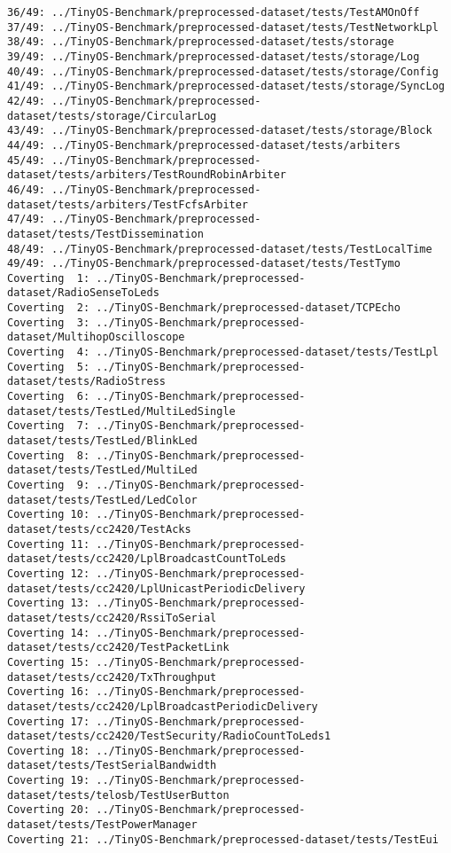 \documentclass[11pt]{article}
\begin{document}
\begin{Verbatim}[commandchars=\\\{\}]
36/49: ../TinyOS-Benchmark/preprocessed-dataset/tests/TestAMOnOff
37/49: ../TinyOS-Benchmark/preprocessed-dataset/tests/TestNetworkLpl
38/49: ../TinyOS-Benchmark/preprocessed-dataset/tests/storage
39/49: ../TinyOS-Benchmark/preprocessed-dataset/tests/storage/Log
40/49: ../TinyOS-Benchmark/preprocessed-dataset/tests/storage/Config
41/49: ../TinyOS-Benchmark/preprocessed-dataset/tests/storage/SyncLog
42/49: ../TinyOS-Benchmark/preprocessed-dataset/tests/storage/CircularLog
43/49: ../TinyOS-Benchmark/preprocessed-dataset/tests/storage/Block
44/49: ../TinyOS-Benchmark/preprocessed-dataset/tests/arbiters
45/49: ../TinyOS-Benchmark/preprocessed-dataset/tests/arbiters/TestRoundRobinArbiter
46/49: ../TinyOS-Benchmark/preprocessed-dataset/tests/arbiters/TestFcfsArbiter
47/49: ../TinyOS-Benchmark/preprocessed-dataset/tests/TestDissemination
48/49: ../TinyOS-Benchmark/preprocessed-dataset/tests/TestLocalTime
49/49: ../TinyOS-Benchmark/preprocessed-dataset/tests/TestTymo
Coverting  1: ../TinyOS-Benchmark/preprocessed-dataset/RadioSenseToLeds
Coverting  2: ../TinyOS-Benchmark/preprocessed-dataset/TCPEcho
Coverting  3: ../TinyOS-Benchmark/preprocessed-dataset/MultihopOscilloscope
Coverting  4: ../TinyOS-Benchmark/preprocessed-dataset/tests/TestLpl
Coverting  5: ../TinyOS-Benchmark/preprocessed-dataset/tests/RadioStress
Coverting  6: ../TinyOS-Benchmark/preprocessed-dataset/tests/TestLed/MultiLedSingle
Coverting  7: ../TinyOS-Benchmark/preprocessed-dataset/tests/TestLed/BlinkLed
Coverting  8: ../TinyOS-Benchmark/preprocessed-dataset/tests/TestLed/MultiLed
Coverting  9: ../TinyOS-Benchmark/preprocessed-dataset/tests/TestLed/LedColor
Coverting 10: ../TinyOS-Benchmark/preprocessed-dataset/tests/cc2420/TestAcks
Coverting 11: ../TinyOS-Benchmark/preprocessed-dataset/tests/cc2420/LplBroadcastCountToLeds
Coverting 12: ../TinyOS-Benchmark/preprocessed-dataset/tests/cc2420/LplUnicastPeriodicDelivery
Coverting 13: ../TinyOS-Benchmark/preprocessed-dataset/tests/cc2420/RssiToSerial
Coverting 14: ../TinyOS-Benchmark/preprocessed-dataset/tests/cc2420/TestPacketLink
Coverting 15: ../TinyOS-Benchmark/preprocessed-dataset/tests/cc2420/TxThroughput
Coverting 16: ../TinyOS-Benchmark/preprocessed-dataset/tests/cc2420/LplBroadcastPeriodicDelivery
Coverting 17: ../TinyOS-Benchmark/preprocessed-dataset/tests/cc2420/TestSecurity/RadioCountToLeds1
Coverting 18: ../TinyOS-Benchmark/preprocessed-dataset/tests/TestSerialBandwidth
Coverting 19: ../TinyOS-Benchmark/preprocessed-dataset/tests/telosb/TestUserButton
Coverting 20: ../TinyOS-Benchmark/preprocessed-dataset/tests/TestPowerManager
Coverting 21: ../TinyOS-Benchmark/preprocessed-dataset/tests/TestEui

\end{Verbatim}
\end{document}
